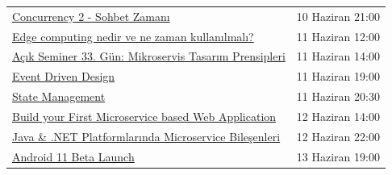 \documentclass[11pt]{article}
\begin{document}
\begin{longtable}{|p{9.5cm}|l|}
\href{https://www.meetup.com/tr-TR/GDG-Cloud-Istanbul/events/271074887}{Concurrency 2 - Sohbet Zamanı} & 10 Haziran 21:00\\
\href{https://kommunity.com/devops-turkiye/events/edge-computing-nedir-ve-ne-zaman-kullanilmali-hands-on-demo-7daf47ae}{Edge computing nedir ve ne zaman kullanılmalı?} & 11 Haziran 12:00\\
\href{https://kommunity.com/tracikkaynak/events/acik-seminer-33-gun-mikroservis-tasarim-prensipleri-7d235132}{Açık Seminer 33. Gün: Mikroservis Tasarım Prensipleri} & 11 Haziran 14:00\\
\href{https://kommunity.com/ddd-istanbul/events/event-driven-design-07b35a22}{Event Driven Design} & 11 Haziran 19:00\\
\href{https://kommunity.com/ngturkey/events/state-management-webinar-113474a0}{State Management} & 11 Haziran 20:30\\
\href{https://www.meetup.com/tr-TR/IBMDeveloperTR/events/270949619}{Build your First Microservice based Web Application} & 12 Haziran 14:00\\
\href{https://kommunity.com/devnot-yazilimci-bulusmalari/events/java-net-platformlarinda-microservice-bilesenleri-84d7a825}{Java \& .NET Platformlarında Microservice Bileşenleri} & 12 Haziran 22:00\\
\href{https://www.meetup.com/tr-TR/GDGIstanbul/events/271109645}{Android 11 Beta Launch} & 13 Haziran 19:00\\
\hline
\end{longtable}
\end{document}
